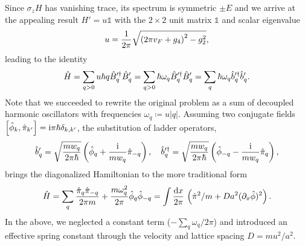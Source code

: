 Since $\sigma_zH$ has vanishing trace, its spectrum is symmetric $\pm E$ and we arrive at the appealing result $H' = u\mathbb1$ with the $2\times2$ unit matrix $\mathbb1$ and scalar eigenvalue
\begin{align}
    u = \frac1{2\pi}\sqrt{\left( 2\pi v_F + g_4 \right)^2 - g_2^2},
\end{align}
leading to the identity
\begin{align}
    \hat H = \sum_{q>0} u\hbar q \hat B'^\dag_q \hat B'^\pdag_q = \sum_{q>0} \hbar \omega_q \hat B'^\dag_q \hat B'^\pdag_q = \sum_q \hbar  \omega_q \hat b'^\dag_q\hat b'^\pdag_q.
\end{align}
Note that we succeeded to rewrite the original problem as a sum of decoupled harmonic oscillators with frequencies $\omega_q\coloneqq u|q|$.
Assuming two conjugate fields $\left[ \hat \phi_{k},\hat \pi_{k'} \right] = \mathrm i\pi\hbar\delta_{k,k'}$, the substitution of ladder operators,
\begin{align}
    \hat b'_q = \sqrt{\frac{mw_q}{2\pi\hbar}}\left( \hat\phi_q + \frac{\mathrm i}{mw_q}\hat\pi_{-q} \right),
    \quad
    \hat b'^\dag_q = \sqrt{\frac{mw_q}{2\pi\hbar}}\left( \hat\phi_{-q} - \frac{\mathrm i}{mw_q}\hat\pi_{q} \right),
\end{align}
brings the diagonalized Hamiltonian to the more traditional form
\begin{align}
    \hat H = \sum_q \frac{\hat\pi_q\hat\pi_{-q}}{2\pi m} + \frac{m\omega_q^2}{2\pi}\hat\phi_q\hat\phi_{-q}
    =
    \int\frac{\mathrm d x}{2\pi}\, \left( \hat\pi^2/m + {Da^2}(\partial_x\hat\phi)^2 \right).
\end{align}
In the above, we neglected a constant term ($-\sum_q\omega_q/2\pi$) and introduced an effective spring constant through the velocity and lattice spacing $D=mu^2/a^2$.

